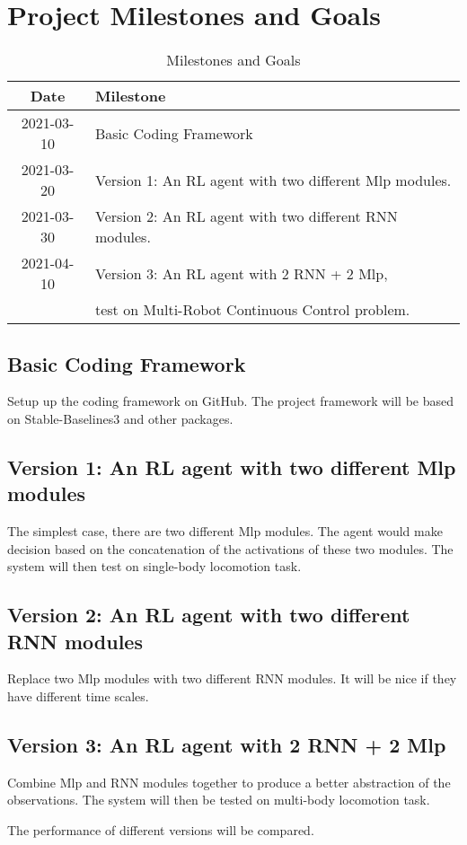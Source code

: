 



\section*{Project Milestones and Goals}

\begin{table}[h]
    \caption{Milestones and Goals}
    \centering
    \begin{tabular}{cl}
        \midrule\midrule
        Date       & Milestone                                           \\
        \midrule\midrule
        2021-03-10 & Basic Coding Framework                      \\
        2021-03-20 & Version 1: An RL agent with two different Mlp modules. \\
        2021-03-30 & Version 2: An RL agent with two different RNN modules. \\
        2021-04-10 & Version 3: An RL agent with 2 RNN + 2 Mlp,             \\
                   & test on Multi-Robot Continuous Control problem.     \\
        \midrule\midrule
    \end{tabular}
    \label{table:m0}
\end{table}

\subsection{Basic Coding Framework}

Setup up the coding framework on GitHub.
The project framework will be based on Stable-Baselines3 and other packages.

\subsection{Version 1: An RL agent with two different Mlp modules}

The simplest case, there are two different Mlp modules.
The agent would make decision based on the concatenation of the activations of these two modules.
The system will then test on single-body locomotion task.

\subsection{Version 2: An RL agent with two different RNN modules}

Replace two Mlp modules with two different RNN modules.
It will be nice if they have different time scales.

\subsection{Version 3: An RL agent with 2 RNN + 2 Mlp}

Combine Mlp and RNN modules together to produce a better abstraction of the observations.
The system will then be tested on multi-body locomotion task.

The performance of different versions will be compared.


